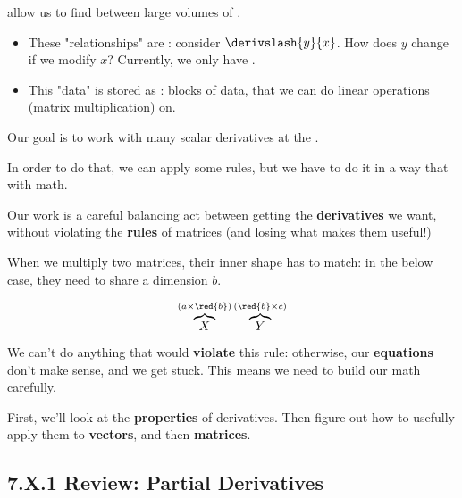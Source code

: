     \begin{concept}
         allow us to find  between large volumes of .
        
        \begin{itemize}
            \item These "relationships" are : consider $\derivslash{y}{x}$. How does $y$ change if we modify $x$? Currently, we only have .
            
            \item This "data" is stored as : blocks of data, that we can do linear operations (matrix multiplication) on.
        \end{itemize}
        
        Our goal is to work with many scalar derivatives at the . 
        
        In order to do that, we can apply some  rules, but we have to do it in a way that  with  math.
    \end{concept}
    
    Our work is a careful balancing act between getting the \textbf{derivatives} we want, without violating the \textbf{rules} of matrices (and losing what makes them useful!)
    
    \miniex When we multiply two matrices, their inner shape has to match: in the below case, they need to share a dimension $b$.
    
    \begin{equation}
        \overbrace{
            X
        }^{ (a \times \red{b}) }
        \overbrace{
            Y
        }^{(\red{b} \times c)}
    \end{equation}
    
    We can't do anything that would \textbf{violate} this rule: otherwise, our \textbf{equations} don't make sense, and we get stuck. This means we need to build our math carefully.
    
    First, we'll look at the \textbf{properties} of derivatives. Then figure out how to usefully apply them to \textbf{vectors}, and then \textbf{matrices}.
    
    \secdiv
    
    \subsection*{7.X.1 \quad Review: Partial Derivatives}
    

